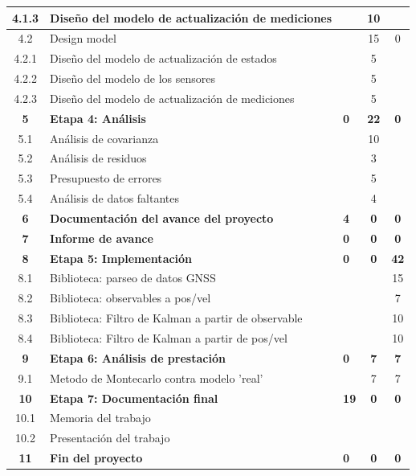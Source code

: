 \documentclass[11pt]{charter}
\begin{document}
\begin{table}[H]
\begin{tabularx}{\linewidth}{@{}|c|X|>{\centering}m{2cm}|c|c|@{}}
4.1.3		& Diseño del modelo de actualización de mediciones	& 	 			& 10 			& 	\\ \hline
\rowcolor{lightgray!25}
4.2			& Design model											& 0 			& 15 			& 0 \\ \hline
4.2.1		& Diseño del modelo de actualización de estados		& 	 			& 5 			&   \\ \hline
4.2.2		& Diseño del modelo de los sensores 					& 	 			& 5 			& 	\\ \hline
4.2.3		& Diseño del modelo de actualización de mediciones	& 	 			& 5 			& 	\\ \hline
\rowcolor{lightgray!50}
\textbf{5}	& \textbf{Etapa 4: Análisis}							& \textbf{0}	& \textbf{22}	& \textbf{0} \\ \hline
5.1			& Análisis de covarianza								& 	 			& 10 			& 	\\ \hline
5.2			& Análisis de residuos 									& 	 			& 3 			& 	\\ \hline
5.3			& Presupuesto de errores								& 	 			& 5 			& 	\\ \hline
5.4			& Análisis de datos faltantes							& 	 			& 4 			& 	\\ \hline
\rowcolor{lightgray!50}
\textbf{6}	& \textbf{Documentación del avance del proyecto} 		& \textbf{4}	& \textbf{0}	& \textbf{0} \\ \hline
\rowcolor{lightgray!50}
\textbf{7} 	& \textbf{Informe de avance} 							& \textbf{0} 	& \textbf{0}	& \textbf{0} \\ \hline
\rowcolor{lightgray!50}
\textbf{8}	& \textbf{Etapa 5: Implementación}						& \textbf{0} 	& \textbf{0} 	& \textbf{42}\\ \hline
8.1			& Biblioteca: parseo de datos GNSS						& 	 			& 	 			& 15\\ \hline
8.2			& Biblioteca: observables a pos/vel					& 	 			& 	 			& 7 \\ \hline
8.3			& Biblioteca: Filtro de Kalman a partir de observable & 	 			& 	 			& 10\\ \hline
8.4			& Biblioteca: Filtro de Kalman a partir de pos/vel 	& 	 			& 	 			& 10\\ \hline
\rowcolor{lightgray!50}
\textbf{9} 	& \textbf{Etapa 6: Análisis de prestación}				& \textbf{0}	& \textbf{7} 	& \textbf{7} \\ \hline
9.1			& Metodo de Montecarlo contra modelo 'real' 			& 	 			& 7 			& 7 \\ \hline
\rowcolor{lightgray!50}
\textbf{10}	& \textbf{Etapa 7: Documentación final}				& \textbf{19} 	& \textbf{0} 	& \textbf{0} \\ \hline
10.1 		& Memoria del trabajo		 							& 15 			& 	 			& 	\\ \hline
10.2 		& Presentación del trabajo		 						& 4 			& 	 			& 	\\ \hline
\rowcolor{lightgray!50}
\textbf{11}	& \textbf{Fin del proyecto} 							& \textbf{0} 	& \textbf{0}	& \textbf{0} \\ \hline
\end{tabularx}%
\end{table}
\end{document}
